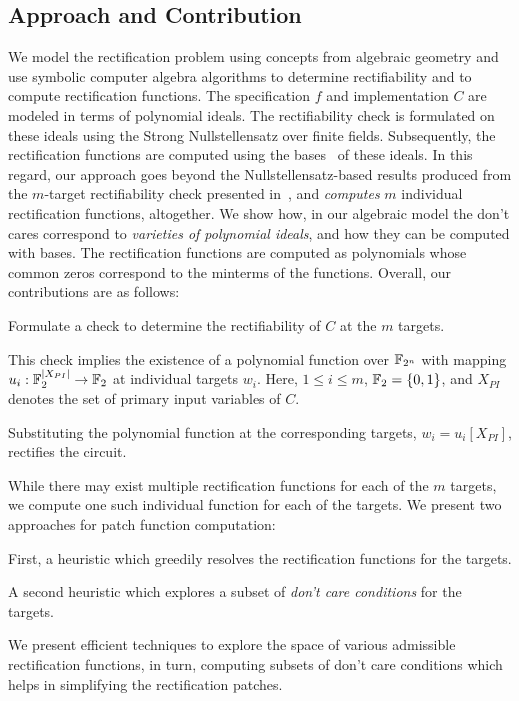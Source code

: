 \subsection{Approach and Contribution}
We model the rectification problem using concepts from algebraic geometry and
use symbolic computer algebra algorithms to determine rectifiability and to 
compute rectification functions. 
The specification $f$ and implementation $C$ are modeled in terms of polynomial ideals. 
The rectifiability check is formulated on these ideals using the Strong Nullstellensatz over finite fields. Subsequently, 
the rectification functions are computed using the \Grobner bases~\cite{gb_book} of these ideals.
In this regard, our approach goes beyond the Nullstellensatz-based 
results produced from the $m$-target rectifiability check presented 
in~\cite{Vkrao:ISQED21}, and {\it computes} $m$ individual rectification 
functions, altogether. We show how, in our algebraic model the don't cares correspond to {\it varieties of polynomial ideals}, and how they can be computed with \Grobner bases. The rectification functions are computed as polynomials whose common zeros correspond to the minterms of the functions.
Overall, our contributions are as follows:

\bi
\item Formulate a check to determine the rectifiability of $C$ at
the $m$ targets.
\bi
    \item This check implies the existence of a polynomial function over ${\mathbb{F}}_{2^n}$ with
    mapping $u_i:{\mathbb{F}}_2^{|X_{PI}|}\rightarrow{\mathbb{F}}_2$ at individual targets $w_i$. Here, 
    $1 \leq i \leq m$, ${\mathbb{F}}_2=\{0,1\}$, and $X_{PI}$ denotes the set of primary input variables of $C$. 
    \item Substituting the polynomial function at the corresponding targets, $w_i = u_i[X_{PI}]$, rectifies the circuit.
\ei

\item While there may exist multiple rectification functions for each of the $m$ targets, we compute one such individual function for each of the targets. 
We present two approaches for patch function computation:

\bi 
\item First, a heuristic which greedily resolves the rectification functions 
for the targets.
\item A second heuristic which explores a subset of {\it don't care conditions} for the targets.
\bi
    \item We present efficient techniques to explore the space of various admissible rectification
functions, in turn, computing subsets of don't care conditions
which helps in simplifying the rectification patches.

